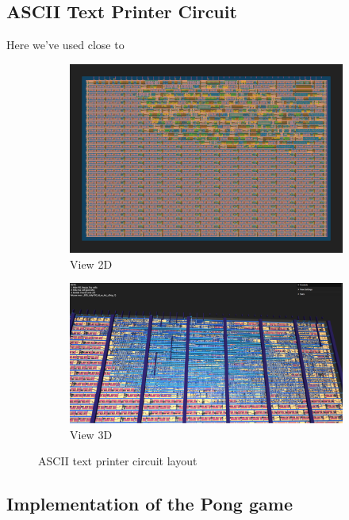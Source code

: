 \subsection{ASCII Text Printer Circuit}
Here we've used close to 
\begin{figure}[H]
    \centering
    \begin{subfigure}[b]{0.45\textwidth}
        \includegraphics[width=\linewidth]{Pictures/Result_ASCII_2D_View.png}
        \caption{View 2D}\label{fig:PWM_2D}
    \end{subfigure}
    \begin{subfigure}[b]{0.45\textwidth}
        \includegraphics[width=\linewidth]{Pictures/Result_ASCII_3D_View.png}
        \caption{View 3D}\label{fig:PWM_3D}
    \end{subfigure}
    \caption{ASCII text printer circuit layout}\label{fig:PWM}
\end{figure}

\subsection{Implementation of the Pong game}


